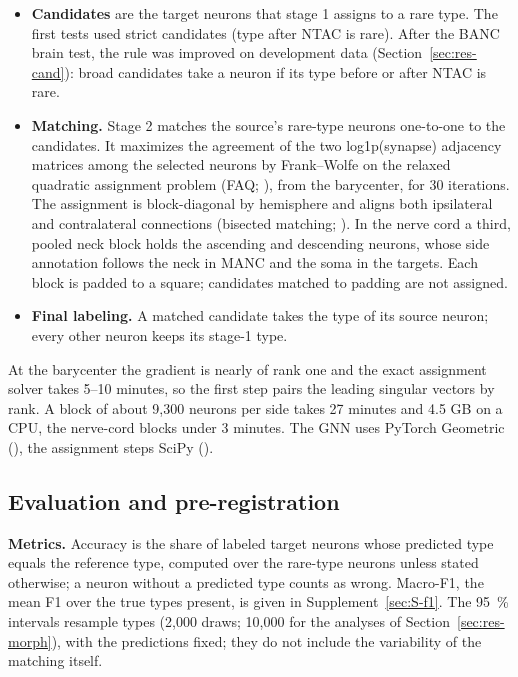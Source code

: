 \documentclass[11pt,a4paper]{article}
\begin{document}
\begin{itemize}[leftmargin=*,itemsep=2pt]

\item \textbf{Candidates} are the target neurons that stage 1 assigns to a rare type. The first tests used strict candidates (type after NTAC is rare). After the BANC brain test, the rule was improved on development data (Section~\ref{sec:res-cand}): broad candidates take a neuron if its type before or after NTAC is rare.

\item \textbf{Matching.} Stage 2 matches the source's rare-type neurons one-to-one to the candidates. It maximizes the agreement of the two log1p(synapse) adjacency matrices among the selected neurons by Frank–Wolfe on the relaxed quadratic assignment problem (FAQ; \citealp{vogelstein2015}), from the barycenter, for 30 iterations. The assignment is block-diagonal by hemisphere and aligns both ipsilateral and contralateral connections (bisected matching; \citealp{pedigo2023}). In the nerve cord a third, pooled neck block holds the ascending and descending neurons, whose side annotation follows the neck in MANC and the soma in the targets. Each block is padded to a square; candidates matched to padding are not assigned.

\item \textbf{Final labeling.} A matched candidate takes the type of its source neuron; every other neuron keeps its stage-1 type.

\end{itemize}

At the barycenter the gradient is nearly of rank one and the exact assignment solver takes 5–10 minutes, so the first step pairs the leading singular vectors by rank. A block of about 9,300 neurons per side takes 27 minutes and 4.5 GB on a CPU, the nerve-cord blocks under 3 minutes. The GNN uses PyTorch Geometric (\citealp{fey2019}), the assignment steps SciPy (\citealp{virtanen2020}).

\subsection{Evaluation and pre-registration}\label{sec:prereg}

\textbf{Metrics.} Accuracy is the share of labeled target neurons whose predicted type equals the reference type, computed over the rare-type neurons unless stated otherwise; a neuron without a predicted type counts as wrong. Macro-F1, the mean F1 over the true types present, is given in Supplement~\ref{sec:S-f1}. The 95~\% intervals resample types (2,000 draws; 10,000 for the analyses of Section~\ref{sec:res-morph}), with the predictions fixed; they do not include the variability of the matching itself.
\end{document}
